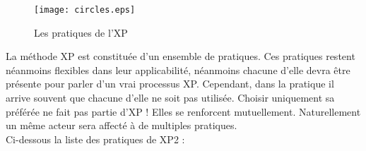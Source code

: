 \documentclass[a4paper,oneside,11pt]{report}
\begin{document}
\begin{figure}[!h]
\begin{center}	
\texttt{[image: circles.eps]}
\caption{\label{fig1}Les pratiques de l'XP} 
\end{center}
\end{figure}


La méthode XP est constituée d'un ensemble de pratiques. Ces pratiques restent néanmoins flexibles dans leur applicabilité, néanmoins chacune d'elle devra être présente pour parler d'un vrai processus XP. Cependant, dans la pratique il arrive souvent que chacune d'elle ne soit pas utilisée. Choisir uniquement sa préférée ne fait pas partie d'XP ! Elles se renforcent mutuellement. Naturellement un même acteur sera affecté à de multiples pratiques.\\

Ci-dessous la liste des pratiques de XP2 :
\end{document}
